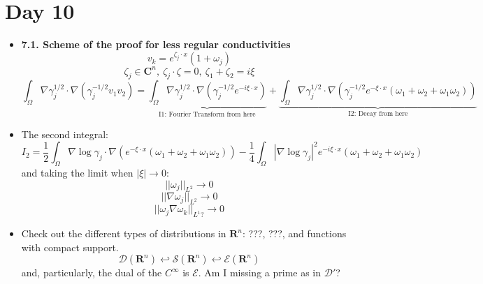\documentclass{article}
\begin{document}
\section*{Day 10}
\begin{itemize}
    \item \textbf{7.1. Scheme of the proof for less regular conductivities}
    \begin{equation}
        v_k = e^{\zeta_j \cdot x} (1 + \omega_j) 
    \end{equation}
    \begin{equation}
        \zeta_j \in \mathbf{C}^n, \ \zeta_j \cdot \zeta = 0, \ \zeta_1 + \zeta_2 = i\xi
    \end{equation}
    \begin{equation}
        \int_\Omega \nabla \gamma^{1/2}_j \cdot \nabla (\gamma^{-1/2}_j v_1 v_2) = \underbrace{\int_\Omega \nabla \gamma^{1/2}_j \cdot \nabla (\gamma^{-1/2}_j e^{-i\xi \cdot x})}_{\text{I1: Fourier Transform from here}}
        + \underbrace{\int_\Omega  \nabla \gamma^{1/2}_j \cdot \nabla ( \gamma^{-1/2}_j e^{-\xi \cdot x} (\omega_1 + \omega_2 + \omega_1 \omega_2))}_{\text{I2: Decay from here}}
    \end{equation}

    \item The second integral:
    \begin{equation}
        I_2 = \frac{1}{2} \int_\Omega  \nabla \log\gamma_j \cdot \nabla ( e^{-\xi \cdot x} (\omega_1 + \omega_2 + \omega_1 \omega_2))
        - \frac{1}{4} \int_\Omega |\nabla \log \gamma_j |^2 e^{-i\xi \cdot x} (\omega_1 + \omega_2 + \omega_1 \omega_2)
    \end{equation}
    and taking the limit when $|\xi| \rightarrow 0$:
    \begin{equation}
        || \omega_j ||_{L^2} \rightarrow 0
    \end{equation}
    \begin{equation}
        || \nabla \omega_j ||_{L^2} \rightarrow 0
    \end{equation}
    \begin{equation}
        || \omega_j \nabla \omega_k||_{L^1?} \rightarrow 0
    \end{equation}

    \item Check out the different types of distributions in $\mathbf{R}^n$: ???, ???, and functions with compact support.
    \begin{equation}
        \mathcal{D}(\mathbf{R}^n) \hookleftarrow \mathcal{S}(\mathbf{R}^n) \hookleftarrow \mathcal{E}(\mathbf{R}^n)
    \end{equation}
    and, particularly, the dual of the $C^\infty$ is $\mathcal{E}$. \color{red} Am I missing a prime as in $\mathcal{D}'$? \color{black}


\end{itemize}
\end{document}

